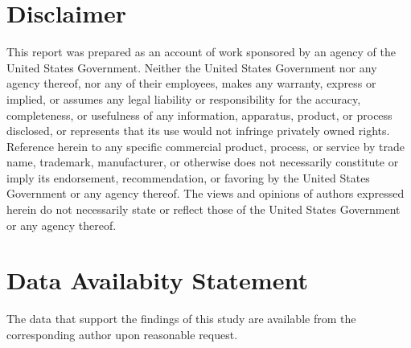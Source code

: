 \documentclass[12pt,prb,aps]{revtex4-1}
\begin{document}
\section*{Disclaimer} This report was prepared as an account of work sponsored by an agency of the United States Government. Neither the United States Government nor any agency thereof, nor any of their employees, makes any warranty, express or implied, or assumes any legal liability or responsibility for the accuracy, completeness, or usefulness of any information, apparatus, product, or process disclosed, or represents that its use would not infringe privately owned rights. Reference herein to any specific commercial product, process, or service by trade name, trademark, manufacturer, or otherwise does not necessarily constitute or imply its endorsement, recommendation, or favoring by the United States Government or any agency thereof. The views and opinions of authors expressed herein do not necessarily state or reflect those of the United States Government or any agency thereof. 
 
\section*{Data Availabity Statement}
The data that support the findings of this study are available from the corresponding author upon reasonable request.
 
\end{document}
